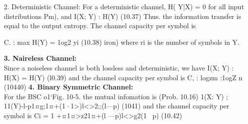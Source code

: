 \documentclass[a4]{beamer}
\begin{document}
\begin{frame}
2. Deterministic Channel:
For a deterministic channel, H( Y|X) = 0 for all input distributions Pm), and
I(X; Y) : H(Y) (10.37)
Thus. the information transfer is equal to the output cntropy. The channel capacity per symbol is

C. : max H(Y) = 1og2 yi (10.38)
iron)
where ri is the number of symbols in Y.
\end{frame}

\begin{frame}
\textbf{3. Naireless Channel:}\\
Since a noiseless channel is both lossless and deterministic, we have
I(X; Y) : H(X) = H(Y) (l0.39)
and the channel capacity per symbol is
C, : logzm :1ogZ n (10440)
\textbf{4. Binary Symmetric Channel:}\\
For the BSC o1`Fig. 10-5. the mutual infomation is (Prob. 10.16)
1(X: Y) ; 11(Y)-l-p1¤g;1¤+(1·1>)l<>2;;(l—p) (1041)
and the channel capacity per symbol is
Ci = 1 +¤1¤>z21¤+(l —p)l<>g2(1 ~p) (10.42)
\end{frame}


\end{document}
